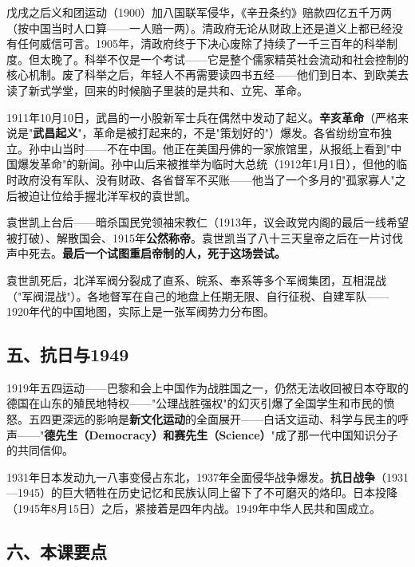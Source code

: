 \documentclass[a4paper,12pt]{ctexart}
\begin{document}
戊戌之后义和团运动（1900）加八国联军侵华，《辛丑条约》赔款四亿五千万两（按中国当时人口算——一人赔一两）。清政府无论从财政上还是道义上都已经没有任何威信可言。1905年，清政府终于下决心废除了持续了一千三百年的科举制度。但\-\-太晚了。科举不仅是一个考试——它是整个儒家精英社会流动和社会控制的核心机制。废了科举之后，年轻人不再需要读四书五经——他们到日本、到欧美去读了新式学堂，回来的时候脑子里装的是共和、立宪、革命。

1911年10月10日，武昌的一小股新军士兵在偶然中发动了起义。\textbf{辛亥革命}（严格来说是"\textbf{武昌起义}"，革命是被打起来的，不是"策划好的"）爆发。各省纷纷宣布独立。孙中山当时——不在中国。他正在美国丹佛的一家旅馆里，从报纸上看到"中国爆发革命"的新闻。孙中山后来被推举为临时大总统（1912年1月1日），但他的临时政府没有军队、没有财政、各省督军不买账——他当了一个多月的"孤家寡人"之后被迫让位给手握北洋军权的袁世凯。

袁世凯上台后——暗杀国民党领袖宋教仁（1913年，议会政党内阁的最后一线希望被打破）、解散国会、1915年\textbf{公然称帝}。袁世凯当了八十三天皇帝之后在一片讨伐声中死去。\textbf{最后一个试图重启帝制的人，死于这场尝试。}

袁世凯死后，北洋军阀分裂成了直系、皖系、奉系等多个军阀集团，互相混战（"军阀混战"）。各地督军在自己的地盘上任期无限、自行征税、自建军队——1920年代的中国地图，实际上是一张军阀势力分布图。

\subsection*{五、抗日与1949}

1919年五四运动——巴黎和会上中国作为战胜国之一，仍然无法收回被日本夺取的德国在山东的殖民地特权——"公理战胜强权"的幻灭引爆了全国学生和市民的愤怒。五四更深远的影响是\textbf{新文化运动}的全面展开——白话文运动、科学与民主的呼声——"\textbf{德先生（Democracy）和赛先生（Science）}"成了那一代中国知识分子的共同信仰。

1931年日本发动九一八事变侵占东北，1937年全面侵华战争爆发。\textbf{抗日战争}（1931—1945）的巨大牺牲在历史记忆和民族认同上留下了不可磨灭的烙印。日本投降（1945年8月15日）之后，紧接着是四年内战。1949年中华人民共和国成立。

\subsection*{六、本课要点}
\end{document}
